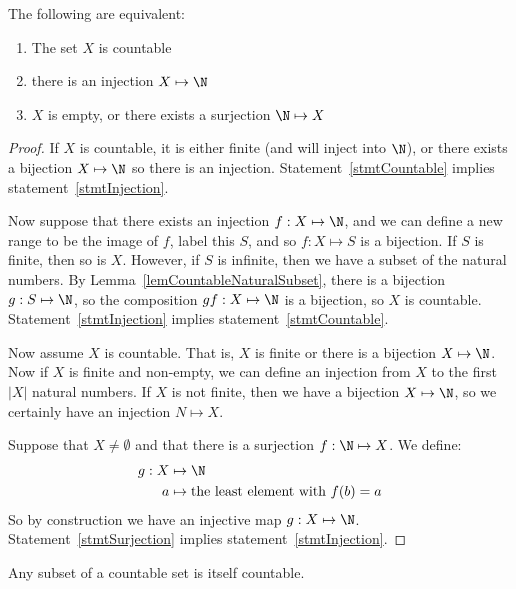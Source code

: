 \documentclass[../Main.tex]{subfiles}
\begin{document}
\begin{theorem}
    \label{thmCountStatements}
    The following are equivalent:\par
    \begin{enumerate}
        \item The set $X$ is countable \label{stmtCountable}
        \item there is an injection $X \mapsto \N$ \label{stmtInjection}
        \item $X$ is empty, or there exists a surjection $\N \mapsto X$ \label{stmtSurjection}
    \end{enumerate}
\end{theorem}
\begin{proof}
    If $X$ is countable, it is either finite (and will inject into $\N$), or there exists a bijection $X \mapsto \N$ so there is an injection. Statement~\ref{stmtCountable} implies statement~\ref{stmtInjection}.\par
    Now suppose that there exists an injection $f : X \mapsto \N$, and we can define a new range to be the image of $f$, label this $S$, and so $f : X \mapsto S$ is a bijection. If $S$ is finite, then so is $X$. However, if $S$ is infinite, then we have a subset of the natural numbers. By Lemma~\ref{lemCountableNaturalSubset}, there is a bijection $g : S \mapsto \N$, so the composition $gf : X \mapsto \N$ is a bijection, so $X$ is countable. Statement~\ref{stmtInjection} implies statement~\ref{stmtCountable}.\par
    Now assume $X$ is countable. That is, $X$ is finite or there is a bijection $X \mapsto \N$. Now if $X$ is finite and non-empty, we can define an injection from $X$ to the first $|X|$ natural numbers. If $X$ is not finite, then we have a bijection $X \mapsto \N$, so we certainly have an injection $N \mapsto X$.\par
    Suppose that $X \neq \emptyset$ and that there is a surjection $f : \N \mapsto X$. We define:
    \begin{align*}
        g : X &\mapsto \N \\
        a &\mapsto \text{the least element with } f(b) = a
    \end{align*}
    So by construction we have an injective map $g : X \mapsto \N$. Statement~\ref{stmtSurjection} implies statement~\ref{stmtInjection}.
\end{proof}
\begin{corollary}
    Any subset of a countable set is itself countable.
    \label{corCountableSubet}
\end{corollary}
\end{document}
